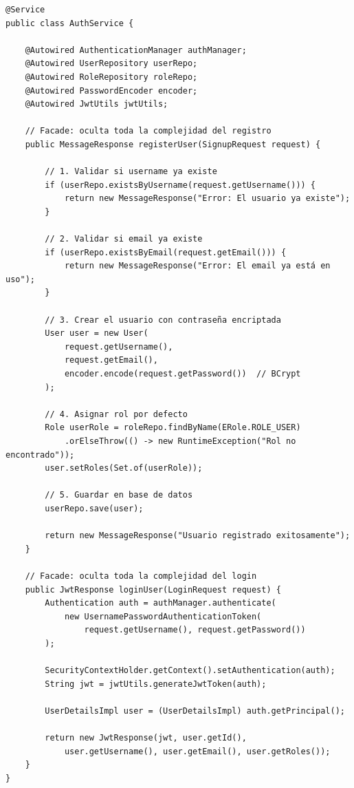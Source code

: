 \documentclass[12pt,a4paper]{article}
\begin{document}
\begin{lstlisting}[caption={AuthService.java -- Facade del sistema de autenticaci\'on}]
@Service
public class AuthService {

    @Autowired AuthenticationManager authManager;
    @Autowired UserRepository userRepo;
    @Autowired RoleRepository roleRepo;
    @Autowired PasswordEncoder encoder;
    @Autowired JwtUtils jwtUtils;

    // Facade: oculta toda la complejidad del registro
    public MessageResponse registerUser(SignupRequest request) {

        // 1. Validar si username ya existe
        if (userRepo.existsByUsername(request.getUsername())) {
            return new MessageResponse("Error: El usuario ya existe");
        }

        // 2. Validar si email ya existe
        if (userRepo.existsByEmail(request.getEmail())) {
            return new MessageResponse("Error: El email ya está en uso");
        }

        // 3. Crear el usuario con contraseña encriptada
        User user = new User(
            request.getUsername(),
            request.getEmail(),
            encoder.encode(request.getPassword())  // BCrypt
        );

        // 4. Asignar rol por defecto
        Role userRole = roleRepo.findByName(ERole.ROLE_USER)
            .orElseThrow(() -> new RuntimeException("Rol no encontrado"));
        user.setRoles(Set.of(userRole));

        // 5. Guardar en base de datos
        userRepo.save(user);

        return new MessageResponse("Usuario registrado exitosamente");
    }

    // Facade: oculta toda la complejidad del login
    public JwtResponse loginUser(LoginRequest request) {
        Authentication auth = authManager.authenticate(
            new UsernamePasswordAuthenticationToken(
                request.getUsername(), request.getPassword())
        );

        SecurityContextHolder.getContext().setAuthentication(auth);
        String jwt = jwtUtils.generateJwtToken(auth);

        UserDetailsImpl user = (UserDetailsImpl) auth.getPrincipal();

        return new JwtResponse(jwt, user.getId(),
            user.getUsername(), user.getEmail(), user.getRoles());
    }
}
\end{lstlisting}
\end{document}
